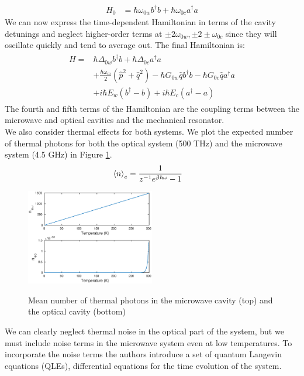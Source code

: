\documentclass[a4paper,11pt, twocolumn]{article}
\numberwithin{equation}{section}
\begin{document}
\begin{align}
 H_0 &= \hbar\omega_{0w}b^\dagger b +\hbar\omega_{0c}a^\dagger a
\end{align}
We can now express the time-dependent Hamiltonian in terms of the cavity detunings and neglect higher-order terms at $\pm2\omega_{0w},\pm2\pm\omega_{0c}$ since they will oscillate quickly and tend to average out.
The final Hamiltonian is:
\begin{align}
\begin{split}
 H = &\hbar\Delta_{0w}b^\dagger b+\hbar\Delta_{0c}a^\dagger a\\
     &+\frac{\hbar\omega_m}{2}(\hat{p}^2+\hat{q}^2)-\hbar G_{0w}\hat{q}b^\dagger b-\hbar G_{0c}\hat{q}a^\dagger a\\
     &+i\hbar E_w(b^\dagger -b)+i\hbar E_c(a^\dagger -a )
\end{split}
\end{align}
The fourth and fifth terms of the Hamiltonian are the coupling terms between the microwave and optical cavities and the mechanical resonator.\\ 
We also consider thermal effects for both systems. We plot the expected number of thermal photons for both the optical system (500 THz) and the microwave system (4.5 GHz) in Figure \ref{fig:thermalnoise}.
\begin{align}
 \braket{n}_e &= \frac{1}{z^{-1}e^{\beta \hbar \omega}-1}
\end{align}
\begin{figure}[ht]
 \caption{Mean number of thermal photons in the microwave cavity (top) and the optical cavity (bottom)}
 \centering
   \includegraphics[width=0.5\textwidth]{figs/ThermalPhotons}
 \label{fig:thermalnoise}
\end{figure}
We can clearly neglect thermal noise in the optical part of the system, but we must include noise terms in the microwave system even at low temperatures.
To incorporate the noise terms the authors introduce a set of quantum Langevin equations (QLEs), differential equations for the time evolution of the system.
\end{document}
